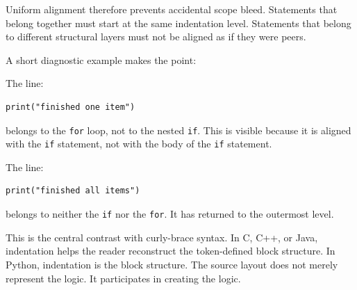 Uniform alignment therefore prevents accidental scope bleed. Statements that belong together must start at the same indentation level. Statements that belong to different structural layers must not be aligned as if they were peers.

A short diagnostic example makes the point:

The line:

\begin{verbatim}
print("finished one item")
\end{verbatim}

belongs to the \texttt{for} loop, not to the nested \texttt{if}. This is visible because it is aligned with the \texttt{if} statement, not with the body of the \texttt{if} statement.

The line:

\begin{verbatim}
print("finished all items")
\end{verbatim}

belongs to neither the \texttt{if} nor the \texttt{for}. It has returned to the outermost level.

This is the central contrast with curly-brace syntax. In C, C++, or Java, indentation helps the reader reconstruct the token-defined block structure. In Python, indentation is the block structure. The source layout does not merely represent the logic. It participates in creating the logic.